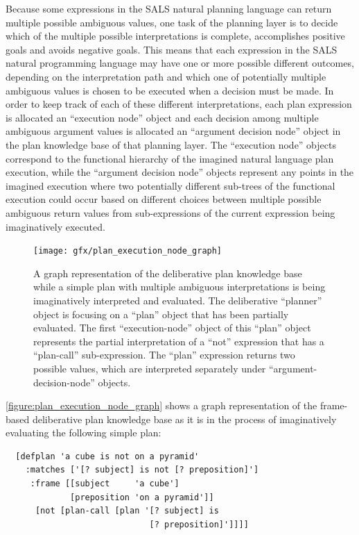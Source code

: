 Because some expressions in the SALS natural planning language can
return multiple possible ambiguous values, one task of the planning
layer is to decide which of the multiple possible interpretations is
complete, accomplishes positive goals and avoids negative goals.  This
means that each expression in the SALS natural programming language
may have one or more possible different outcomes, depending on the
interpretation path and which one of potentially multiple ambiguous
values is chosen to be executed when a decision must be made.  In
order to keep track of each of these different interpretations, each
plan expression is allocated an ``execution node'' object and each
decision among multiple ambiguous argument values is allocated an
``argument decision node'' object in the plan knowledge base of that
planning layer.  The ``execution node'' objects correspond to the
functional hierarchy of the imagined natural language plan execution,
while the ``argument decision node'' objects represent any points in
the imagined execution where two potentially different sub-trees of
the functional execution could occur based on different choices
between multiple possible ambiguous return values from sub-expressions
of the current expression being imaginatively executed.
\begin{figure}
\hspace*{-1cm}\texttt{[image: gfx/plan\_execution\_node\_graph]}
\caption[A graph representation of the deliberative plan knowledge
  base while a simple plan with multiple ambiguous interpretations is
  being imaginatively interpreted and evaluated.]{A graph
  representation of the deliberative plan knowledge base while a
  simple plan with multiple ambiguous interpretations is being
  imaginatively interpreted and evaluated.  The deliberative
  ``planner'' object is focusing on a ``plan'' object that has been
  partially evaluated.  The first ``execution-node'' object of this
  ``plan'' object represents the partial interpretation of a ``not''
  expression that has a ``plan-call'' sub-expression.  The ``plan''
  expression returns two possible values, which are interpreted
  separately under ``argument-decision-node'' objects.}
\label{figure:plan_execution_node_graph}
\end{figure}
{\mbox{\autoref{figure:plan_execution_node_graph}}} shows a graph
representation of the frame-based deliberative plan knowledge base as
it is in the process of imaginatively evaluating the following simple
plan:
\begin{samepage}
\begin{Verbatim}
  [defplan 'a cube is not on a pyramid'
    :matches ['[? subject] is not [? preposition]']
     :frame [[subject     'a cube']
             [preposition 'on a pyramid']]
      [not [plan-call [plan '[? subject] is
                             [? preposition]']]]]
\end{Verbatim}
\end{samepage}
